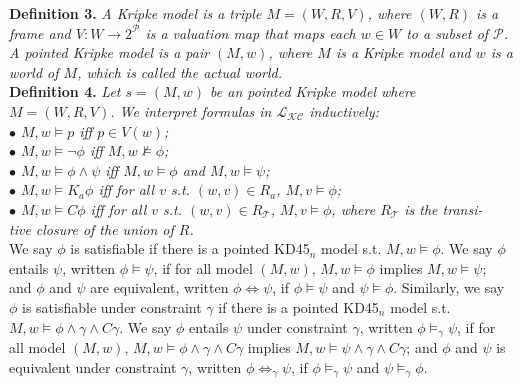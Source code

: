 \documentclass{llncs}
\begin{document}
\textbf{Definition 3.} \textit{A Kripke model is a triple $M=(W,R,V)$, where $(W,R)$ is a frame and $V: W\rightarrow 2^{\mathcal{P}}$ is a valuation map that maps each $w\in W$ to a subset of $\mathcal{P}$. A pointed Kripke model is a pair $(M, w)$, where $M$ is a Kripke model and $w$ is a world of $M$, which is called the actual world.}\vspace{0.05in}\\
\textbf{Definition 4.} \textit{Let $s = (M, w)$ be an pointed Kripke model where $M=(W,R,V)$. We interpret formulas in $\mathcal{L}_{\mathcal{K}\mathcal{C}}$ inductively:\\
\hspace*{0.1in}$\bullet$ $M, w\models p$ iff $p\in V(w)$;\\
\hspace*{0.1in}$\bullet$ $M, w\models \lnot\phi$ iff $M, w\not\models\phi$;\\
\hspace*{0.1in}$\bullet$ $M, w\models\phi\land\psi$ iff $M, w\models\phi$ and $M, w\models\psi$;\\
\hspace*{0.1in}$\bullet$ $M, w\models K_a\phi$ iff for all $v$ s.t. $(w,v)\in R_a$, $M,v\models\phi$;\\
\hspace*{0.1in}$\bullet$ $M, w\models C\phi$ iff for all $v$ s.t. $(w,v)\in R_\mathcal{T}$, $M, v\models\phi$, where $R_\mathcal{T}$ is the transi-\\ \hspace*{0.1in}\hspace{0.1in}tive closure of the union of $R$.}\vspace{0.05in}\\
We say $\phi$ is satisfiable if there is a pointed KD45$_n$ model s.t. $M, w\models\phi$. We say $\phi$ entails $\psi$, written $\phi\models\psi$, if for all model $(M, w)$, $M, w\models\phi$ implies $M,w\models\psi$; and $\phi$ and $\psi$ are equivalent, written $\phi\Leftrightarrow\psi$, if $\phi\models\psi$ and $\psi\models\phi$. Similarly, we say $\phi$ is satisfiable under constraint $\gamma$ if there is a pointed KD45$_n$ model s.t. $M, w\models\phi\land\gamma\land C\gamma$. We say $\phi$ entails $\psi$ under constraint $\gamma$, written $\phi\models_\gamma\psi$, if for all model $(M, w)$, $M, w\models\phi\land\gamma\land C\gamma$ implies $M,w\models\psi\land\gamma\land C\gamma$; and $\phi$ and $\psi$ is equivalent under constraint $\gamma$, written $\phi\Leftrightarrow_\gamma\psi$, if $\phi\models_\gamma\psi$ and $\psi\models_\gamma\phi$.
\end{document}
